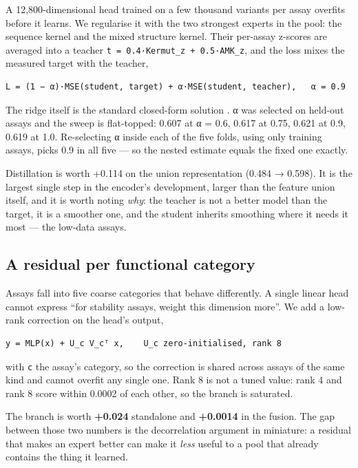 \documentclass[sigconf,review,nonacm]{acmart}
\begin{document}
A 12,800-dimensional head trained on a few thousand variants per assay overfits before it learns. We
regularise it with the two strongest experts in the pool: the sequence kernel and the mixed structure
kernel. Their per-assay z-scores are averaged into a teacher \texttt{t\ =\ 0.4·Kermut\_z\ +\ 0.5·AMK\_z}, and the
loss mixes the measured target with the teacher,

\begin{verbatim}
L = (1 − α)·MSE(student, target) + α·MSE(student, teacher),   α = 0.9
\end{verbatim}

The ridge itself is the standard closed-form solution \cite{rasmussen2006}. α was selected on
held-out assays and the sweep is flat-topped: 0.607 at α = 0.6, 0.617 at 0.75, 0.621
at 0.9, 0.619 at 1.0. Re-selecting α inside each of the five folds, using only training assays, picks
0.9 in all five --- so the nested estimate equals the fixed one exactly.

Distillation is worth +0.114 on the union representation (0.484 → 0.598). It is the largest single step
in the encoder's development, larger than the feature union itself, and it is worth noting \emph{why}: the
teacher is not a better model than the target, it is a smoother one, and the student inherits smoothing
where it needs it most --- the low-data assays.

\subsection{A residual per functional category}\label{a-residual-per-functional-category}

Assays fall into five coarse categories that behave differently. A single linear head cannot express
``for stability assays, weight this dimension more''. We add a low-rank correction on the head's output,

\begin{verbatim}
y = MLP(x) + U_c V_cᵀ x,    U_c zero-initialised, rank 8
\end{verbatim}

with \texttt{c} the assay's category, so the correction is shared across assays of the same kind and cannot
overfit any single one. Rank 8 is not a tuned value: rank 4 and rank 8 score within 0.0002 of each
other, so the branch is saturated.

The branch is worth \textbf{+0.024} standalone and \textbf{+0.0014} in the fusion. The gap between those two
numbers is the decorrelation argument in miniature: a residual that makes an expert better can make it
\emph{less} useful to a pool that already contains the thing it learned.
\end{document}
